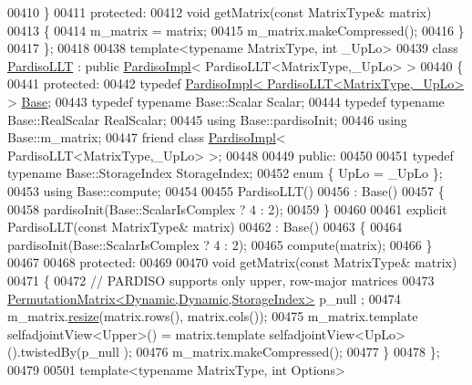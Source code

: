 \begin{DoxyCode}
00410     \}
00411   \textcolor{keyword}{protected}:
00412     \textcolor{keywordtype}{void} getMatrix(\textcolor{keyword}{const} MatrixType& matrix)
00413     \{
00414       m\_matrix = matrix;
00415       m\_matrix.makeCompressed();
00416     \}
00417 \};
00418 
00438 \textcolor{keyword}{template}<\textcolor{keyword}{typename} MatrixType, \textcolor{keywordtype}{int} \_UpLo>
00439 \textcolor{keyword}{class }\hyperlink{class_eigen_1_1_pardiso_l_l_t}{PardisoLLT} : \textcolor{keyword}{public} \hyperlink{class_eigen_1_1_pardiso_impl}{PardisoImpl}< PardisoLLT<MatrixType,\_UpLo> >
00440 \{
00441   \textcolor{keyword}{protected}:
00442     \textcolor{keyword}{typedef} \hyperlink{class_eigen_1_1_pardiso_impl}{PardisoImpl< PardisoLLT<MatrixType,\_UpLo>} > 
      \hyperlink{group___sparse_core___module}{Base};
00443     \textcolor{keyword}{typedef} \textcolor{keyword}{typename} Base::Scalar Scalar;
00444     \textcolor{keyword}{typedef} \textcolor{keyword}{typename} Base::RealScalar RealScalar;
00445     \textcolor{keyword}{using} Base::pardisoInit;
00446     \textcolor{keyword}{using} Base::m\_matrix;
00447     \textcolor{keyword}{friend} \textcolor{keyword}{class }\hyperlink{class_eigen_1_1_pardiso_impl}{PardisoImpl}< PardisoLLT<MatrixType,\_UpLo> >;
00448 
00449   \textcolor{keyword}{public}:
00450 
00451     \textcolor{keyword}{typedef} \textcolor{keyword}{typename} Base::StorageIndex StorageIndex;
00452     \textcolor{keyword}{enum} \{ UpLo = \_UpLo \};
00453     \textcolor{keyword}{using} Base::compute;
00454 
00455     PardisoLLT()
00456       : Base()
00457     \{
00458       pardisoInit(Base::ScalarIsComplex ? 4 : 2);
00459     \}
00460 
00461     \textcolor{keyword}{explicit} PardisoLLT(\textcolor{keyword}{const} MatrixType& matrix)
00462       : Base()
00463     \{
00464       pardisoInit(Base::ScalarIsComplex ? 4 : 2);
00465       compute(matrix);
00466     \}
00467     
00468   \textcolor{keyword}{protected}:
00469     
00470     \textcolor{keywordtype}{void} getMatrix(\textcolor{keyword}{const} MatrixType& matrix)
00471     \{
00472       \textcolor{comment}{// PARDISO supports only upper, row-major matrices}
00473       \hyperlink{group___core___module}{PermutationMatrix<Dynamic,Dynamic,StorageIndex>} p\_null
      ;
00474       m\_matrix.\hyperlink{group___core___module_a0e0fda6e84d69e02432e4770359bb532}{resize}(matrix.rows(), matrix.cols());
00475       m\_matrix.template selfadjointView<Upper>() = matrix.template selfadjointView<UpLo>().twistedBy(p\_null
      );
00476       m\_matrix.makeCompressed();
00477     \}
00478 \};
00479 
00501 \textcolor{keyword}{template}<\textcolor{keyword}{typename} MatrixType, \textcolor{keywordtype}{int} Options>

\end{DoxyCode}
